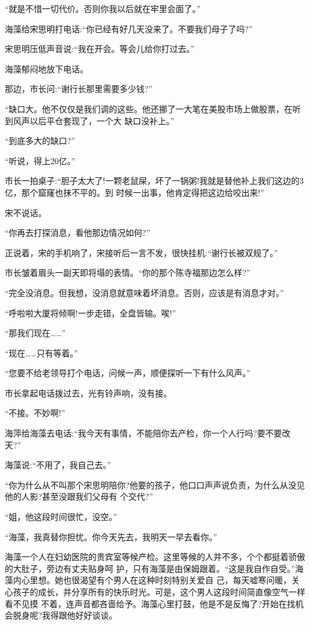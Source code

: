\documentclass[11pt,a4paper,onecolumn]{article}
\begin{document}
``就是不惜一切代价。否则你我以后就在牢里会面了。''

海藻给宋思明打电话:``你已经有好几天没来了。不要我们母子了吗?''

宋思明压低声音说:``我在开会。等会儿给你打过去。''

海藻郁闷地放下电话。

那边，市长问:``谢行长那里需要多少钱?''

``缺口大。他不仅仅是我们调的这些。他还挪了一大笔在美股市场上做股票，在听到风声以后平仓套现了，一个大
缺口没补上。''

``到底多大的缺口?''

``听说，得上20亿。''

市长一拍桌子:``胆子太大了!一颗老鼠屎，坏了一锅粥!我就是替他补上我们这边的3亿，那个窟窿也抹不平的。到
时候一出事，他肯定得把这边给咬出来!''

宋不说话。

``你再去打探消息，看他那边情况如何?''

正说着，宋的手机响了，宋接听后一言不发，很快挂机:``谢行长被双规了。''

市长皱着眉头一副天即将塌的表情。``你的那个陈寺福那边怎么样?''

``完全没消息。但我想，没消息就意味着坏消息。否则，应该是有消息才对。''

``呼啦啦大厦将倾啊!一步走错，全盘皆输。唉!''

``那我们现在……''

``现在……只有等着。''

``您要不给老领导打个电话，问候一声，顺便探听一下有什么风声。''

市长拿起电话拨过去，光有铃声响，没有接。

``不接。不妙啊!''

海萍给海藻去电话:``我今天有事情，不能陪你去产检，你一个人行吗?要不要改天?''

海藻说:``不用了，我自己去。''

``你为什么从不叫那个宋思明陪你?他要的孩子，他口口声声说负责，为什么从没见他的人影?甚至没跟我们父母有
个交代?''

``姐，他这段时间很忙，没空。''

``海藻，我真替你担忧。你今天先去，我明天一早去看你。''

海藻一个人在妇幼医院的贵宾室等候产检。这里等候的人并不多，个个都挺着骄傲的大肚子，旁边有丈夫贴身呵
护，只有海藻是由保姆跟着。``这是我自作自受。''海藻内心里想。她也很渴望有个男人在这种时刻特别关爱自
己，每天嘘寒问暖，关心孩子的成长，并分享所有的快乐时光。可是，这个男人这段时间简直像空气一样看不见摸
不着，连声音都吝啬给予。海藻心里打鼓，他是不是反悔了?开始在找机会脱身呢?我得跟他好好谈谈。
\end{document}

